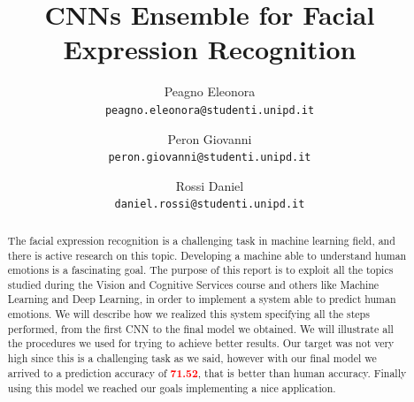 \documentclass[10pt,twocolumn,letterpaper]{article}
\begin{document}
\title{CNNs Ensemble for Facial Expression Recognition}

\author{
   Peagno Eleonora\\
   {\tt \small peagno.eleonora@studenti.unipd.it}
   \and
   Peron Giovanni\\
   {\tt \small peron.giovanni@studenti.unipd.it}
   \and
   Rossi Daniel\\
   {\tt \small daniel.rossi@studenti.unipd.it}
}

\maketitle

\begin{abstract}
   The facial expression recognition is a challenging task in machine learning field, and there is active research on this topic. Developing a machine able to understand human emotions is a fascinating goal. The purpose of this report is to exploit all the topics studied during the Vision and Cognitive Services course and others like Machine Learning and Deep Learning, in order to implement a system able to predict human emotions. We will describe how we realized this system specifying all the steps performed, from the first CNN to the final model we obtained. We will illustrate all the procedures we used for trying to achieve better results. Our target was not very high since this is a challenging task as we said, however with our final model we arrived to a prediction accuracy of \textbf{\textcolor{red}{71.52}}, that is better than human accuracy. Finally using this model we reached our goals implementing a nice application.
\end{abstract}
\end{document}
